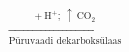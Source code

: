 \documentclass[preview]{standalone}
\begin{document}
\begin{align*}
\xrightarrow[\text{Püruvaadi dekarboksülaas}]{+\:\text{H}^{+}; \:\uparrow\: \text{CO}_2}
\end{align*}
\end{document}
